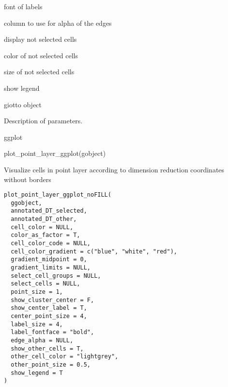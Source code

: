 \documentclass[a4paper]{book}
\begin{document}
\begin{Arguments}
\begin{ldescription}
\item[\code{label\_fontface}] font of labels

\item[\code{edge\_alpha}] column to use for alpha of the edges

\item[\code{show\_other\_cells}] display not selected cells

\item[\code{other\_cell\_color}] color of not selected cells

\item[\code{other\_point\_size}] size of not selected cells

\item[\code{show\_legend}] show legend

\item[\code{gobject}] giotto object
\end{ldescription}
\end{Arguments}
%
\begin{Details}\relax
Description of parameters.
\end{Details}
%
\begin{Value}
ggplot
\end{Value}
%
\begin{Examples}
\begin{ExampleCode}
    plot_point_layer_ggplot(gobject)
\end{ExampleCode}
\end{Examples}
%
\begin{Description}\relax
Visualize cells in point layer according to dimension reduction coordinates without borders
\end{Description}
%
\begin{Usage}
\begin{verbatim}
plot_point_layer_ggplot_noFILL(
  ggobject,
  annotated_DT_selected,
  annotated_DT_other,
  cell_color = NULL,
  color_as_factor = T,
  cell_color_code = NULL,
  cell_color_gradient = c("blue", "white", "red"),
  gradient_midpoint = 0,
  gradient_limits = NULL,
  select_cell_groups = NULL,
  select_cells = NULL,
  point_size = 1,
  show_cluster_center = F,
  show_center_label = T,
  center_point_size = 4,
  label_size = 4,
  label_fontface = "bold",
  edge_alpha = NULL,
  show_other_cells = T,
  other_cell_color = "lightgrey",
  other_point_size = 0.5,
  show_legend = T
)
\end{verbatim}
\end{Usage}
\end{document}
